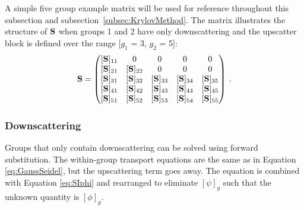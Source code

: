 A simple five group example matrix will be used for reference throughout this subsection and subsection~\ref{subsec:KrylovMethod}. The matrix illustrates the structure of $\mathbf{S}$  when groups 1 and 2 have only downscattering and the upscatter block is defined over the range [$g_{1}$ = 3, $g_{2}$ = 5]:
%
\begin{equation}
  \mathbf{S}  =     \begin{pmatrix}
      [\ve{S}]_{11} &0 & 0 & 0 & 0 \\
      [\ve{S}]_{21} & [\ve{S}]_{22} & 0 & 0 & 0 \\
      [\ve{S}]_{31} & [\ve{S}]_{32} & [\ve{S}]_{33} & [\ve{S}]_{34} & [\ve{S}]_{35} \\
      [\ve{S}]_{41} & [\ve{S}]_{42} & [\ve{S}]_{43} & [\ve{S}]_{44} & [\ve{S}]_{45} \\
      [\ve{S}]_{51} & [\ve{S}]_{52} & [\ve{S}]_{53} & [\ve{S}]_{54} & [\ve{S}]_{55}
    \end{pmatrix} \:.
    \label{eq:exmp-matrix}
\end{equation}

\subsubsection{Downscattering}
Groups that only contain downscattering can be solved using forward substitution. The within-group transport equations are the same as in Equation \eqref{eq:GaussSeidel}, but the upscattering term goes away. The equation is combined with Equation \eqref{eq:SIphi} and rearranged to eliminate $[\psi]_{g}$ such that the unknown quantity is $[\phi]_{g}$. 

